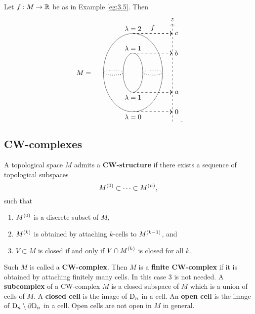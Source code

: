 \begin{example}
Let $ f : M \to \mathbb{R} $ be as in Example \ref{eg:3.5}. Then
$$
\begin{tikzpicture}
\draw (-2.5, 0) node{$ M = $};
\draw (0, 0) ellipse (1.5 and 2);
\draw (0, 0) ellipse (0.5 and 1);
\draw [dotted, thick] (-1.5, 0) arc (-180:0:0.5 and 0.125);
\draw [dotted, thick] (0.5, 0) arc (-180:0:0.5 and 0.125);
\draw [dotted] (-1.5, 0) arc (180:0:0.5 and 0.125);
\draw [dotted] (0.5, 0) arc (180:0:0.5 and 0.125);
\draw [->, dashed] (2, -2.5) to (2, 2.5) node[above]{$ z $};
\draw (1, 2) node[above]{$ f $};
\draw [->, dashed, thick] (0, -2) node[below]{$ \lambda = 0 $} to (2, -2) node[right]{$ 0 $};
\draw [->, dashed, thick] (0, -1) node[below]{$ \lambda = 1 $} to (2, -1) node[right]{$ a $};
\draw [->, dashed, thick] (0, 1) node[above]{$ \lambda = 1 $} to (2, 1) node[right]{$ b $};
\draw [->, dashed, thick] (0, 2) node[above]{$ \lambda = 2 $} to (2, 2) node[right]{$ c $};
\end{tikzpicture}.
$$
\end{example}

\subsection{CW-complexes}

\begin{definition}
A topological space $ M $ admits a \textbf{CW-structure} if there exists a sequence of topological subspaces
$$ M^{\br{0}} \subset \dots \subset M^{\br{n}}, $$
such that
\begin{enumerate}
\item $ M^{\br{0}} $ is a discrete subset of $ M $,
\item $ M^{\br{k}} $ is obtained by attaching $ k $-cells to $ M^{\br{k - 1}} $, and
\item $ V \subset M $ is closed if and only if $ V \cap M^{\br{k}} $ is closed for all $ k $.
\end{enumerate}
Such $ M $ is called a \textbf{CW-complex}. Then $ M $ is a \textbf{finite CW-complex} if it is obtained by attaching finitely many cells. In this case $ 3 $ is not needed. A \textbf{subcomplex} of a CW-complex $ M $ is a closed subspace of $ M $ which is a union of cells of $ M $. A \textbf{closed cell} is the image of $ \mathrm{D}_n $ in a cell. An \textbf{open cell} is the image of $ \mathrm{D}_n \setminus \partial\mathrm{D}_n $ in a cell. Open cells are not open in $ M $ in general.
\end{definition}

